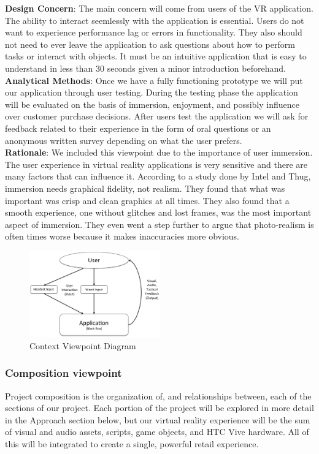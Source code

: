 \documentclass[10pt,journal,compsoc,onecolumn, draftclsnofoot]{IEEEtran}
\begin{document}
\hangindent=0.5cm \textbf{Design Concern}: The main concern will come from
users of the VR application. The ability to interact seemlessly with the application is
essential. Users do not want to experience performance lag or errors in functionality.
They also should not need to ever leave the application to ask questions about how to
perform tasks or interact with objects. It must be an intuitive application
that is easy to understand in less than 30 seconds given a minor introduction
beforehand. \\

\hangindent=0.5cm \textbf{Analytical Methods}: Once we have a fully functioning
prototype we will put our application through user testing. During the testing
phase the application will be evaluated on the basis of immersion, enjoyment,
and possibly influence over customer purchase decisions. After users test the
application we will ask for feedback related to their experience in the form of
oral questions or an anonymous written survey depending on what the user
prefers. \\

\hangindent=0.5cm \textbf{Rationale}: We included this viewpoint due to the importance of user immersion. The user experience in virtual reality applications is very sensitive and there are many factors that can influence it. According to a study done by Intel and Thug\cite{michalak_lind_round1}, immersion needs graphical fidelity, not realism. They found that what was important was crisp and clean graphics at all times. They also found that a smooth experience, one without glitches and lost frames, was the most important aspect of immersion. They even went a step further to argue that photo-realism is often times worse because it makes inaccuracies more obvious.

\begin{figure}[h]
\centering
\caption{Context Viewpoint Diagram}
\includegraphics[width=0.5\textwidth]{projectContext.eps}
\end{figure}

\subsubsection{Composition viewpoint}
Project composition is the organization of, and relationships between, each of
the sections of our project. Each portion of the project will be explored in
more detail in the Approach section below, but our virtual reality experience
will be the sum of visual and audio assets, scripts, game objects, and HTC Vive
hardware. All of this will be integrated to create a single, powerful retail
experience.\\
\end{document}
